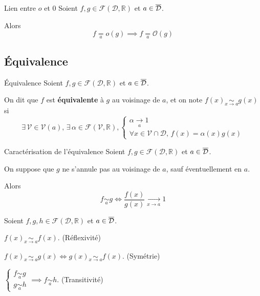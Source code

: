    \begin{prop}{Lien entre $o$ et $\mathcal{0}$}{}
        Soient $f,g \in \mathcal{F}(\mathcal{D},\mathbb{R})$ et $a \in \overline{\mathcal{D}}$. 
    
        Alors \[ f \underset{a}{=} o(g) \implies f \underset{a}{=} \mathcal{O}(g) \]
    \end{prop}

\subsection{Équivalence}

    \begin{defi}{Équivalence}{}
        Soient $f,g \in \mathcal{F}(\mathcal{D},\mathbb{R})$ et $a \in \overline{\mathcal{D}}$.

        On dit que $f$ est \textbf{équivalente} à $g$ au voisinage de $a$, et on note $ f(x) \underset{x \rightarrow a}{\sim} g(x) $ si 
        \[ \exists \, \mathcal{V} \in \mathcal{V}(a), \, \exists \, \alpha \in \mathcal{F}(\mathcal{V}, \mathbb{R}), \left\{ \begin{array}{l}
            \alpha \underset{a}{\longrightarrow} 1  \\
            \forall x \in \mathcal{V} \cap \mathcal{D}, \, f(x) = \alpha(x)g(x)
        \end{array} \right. \]
    \end{defi}

    \begin{theo}{Caractérisation de l’équivalence}{}
        Soient $f,g \in \mathcal{F}(\mathcal{D},\mathbb{R})$ et $a \in \overline{\mathcal{D}}$.

        On suppose que $g$ ne s’annule pas au voisinage de $a$, sauf éventuellement en $a$. 

        Alors \[ f \underset{a}{\sim} g \iff \frac{f(x)}{g(x)} \underset{x \rightarrow a}{\longrightarrow} 1 \]
    \end{theo}

    \begin{prop}{}{}
        Soient $f,g,h \in \mathcal{F}(\mathcal{D},\mathbb{R})$ et $a \in \overline{\mathcal{D}}$.

        \begin{alors}
            \item $f(x) \underset{x \rightarrow a}{\sim} f(x)$. (Réflexivité)
            \item $f(x) \underset{x \rightarrow a}{\sim} g(x) \iff g(x) \underset{x \rightarrow a}{\sim} f(x)$. (Symétrie)
            \item $\left\{ \begin{array}{l}
                f \underset{a}{\sim} g \\
                g \underset{a}{\sim} h
            \end{array} \right. \implies f \underset{a}{\sim} h$. (Transitivité)
        \end{alors}
    \end{prop}

